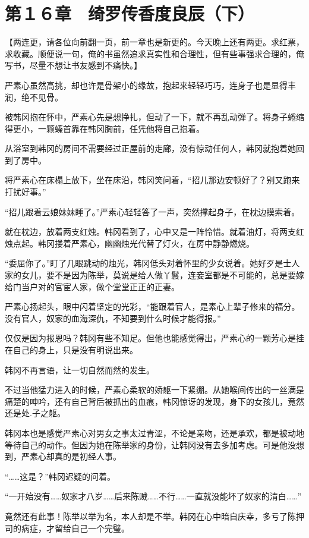 \section{第１６章　绮罗传香度良辰（下）}

【两连更，请各位向前翻一页，前一章也是新更的。今天晚上还有两更。求红票，求收藏。顺便说一句，俺的书虽然追求真实性和合理性，但有些事强求合理的，俺写书，尽量不想让书友感到不痛快。】

严素心虽然高挑，却也许是骨架小的缘故，抱起来轻轻巧巧，连身子也是显得丰润，绝不见骨。

被韩冈抱在怀中，严素心先是想挣扎，但动了一下，就不再乱动弹了。将身子蜷缩得更小，一颗螓首靠在韩冈胸前，任凭他将自己抱着。

从浴室到韩冈的房间不需要经过正屋前的走廊，没有惊动任何人，韩冈就抱着她回到了房中。

将严素心在床榻上放下，坐在床沿，韩冈笑问着，“招儿那边安顿好了？别又跑来打扰好事。”

“招儿跟着云娘妹妹睡了。”严素心轻轻答了一声，突然撑起身子，在枕边摸索着。

就在枕边，放着两支红烛。韩冈看到了，心中又是一阵怜惜。就着油灯，将两支红烛点起。韩冈搂着严素心，幽幽烛光代替了灯火，在房中静静燃烧。

“委屈你了。”盯了几眼跳动的烛光，韩冈低头对着怀里的少女说着。她好歹是士人家的女儿，要不是因为陈举，莫说是给人做丫鬟，连妾室都是不可能的，总是要嫁给门当户对的官宦人家，做个堂堂正正的正妻。

严素心扬起头，眼中闪着坚定的光彩，“能跟着官人，是素心上辈子修来的福分。没有官人，奴家的血海深仇，不知要到什么时候才能得报。”

仅仅是因为报恩吗？韩冈有些不知足。但他也能感觉得出，严素心的一颗芳心是挂在自己的身上，只是没有明说出来。

韩冈不再言语，让一切自然而然的发生。

不过当他猛力进入的时候，严素心柔软的娇躯一下紧绷。从她喉间传出的一丝满是痛楚的呻吟，还有自己背后被抓出的血痕，韩冈惊讶的发现，身下的女孩儿，竟然还是处.子之躯。

韩冈本也是感觉严素心对男女之事太过青涩，不论是亲吻，还是承欢，都是被动地等待自己的动作。但因为她在陈举家的身份，让韩冈没有去多加考虑。可是他没想到，严素心却真的是初经人事。

“……这是？”韩冈迟疑的问着。

“一开始没有……奴家才八岁……后来陈贼……不行……一直就没能坏了奴家的清白……”

竟然还有此事！陈举以举为名，本人却是不举。韩冈在心中暗自庆幸，多亏了陈押司的病症，才留给自己一个完璧。


